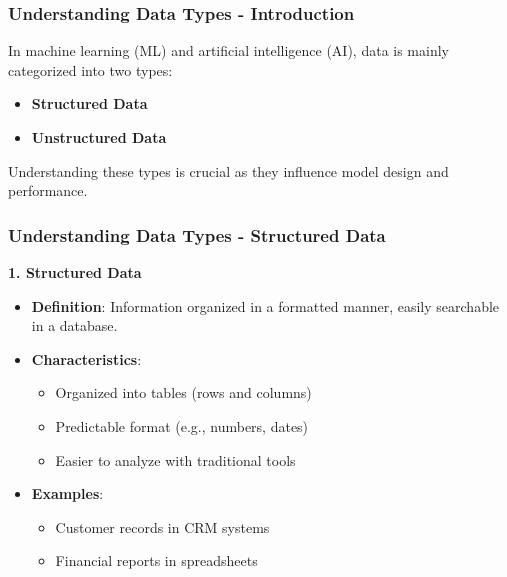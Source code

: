 \documentclass[aspectratio=169]{beamer}
\begin{document}
\begin{frame}[fragile]
    \frametitle{Understanding Data Types - Introduction}
    In machine learning (ML) and artificial intelligence (AI), data is mainly categorized into two types:
    \begin{itemize}
        \item \textbf{Structured Data}
        \item \textbf{Unstructured Data}
    \end{itemize}
    Understanding these types is crucial as they influence model design and performance.
\end{frame}

\begin{frame}[fragile]
    \frametitle{Understanding Data Types - Structured Data}
    \textbf{1. Structured Data}
    \begin{itemize}
        \item \textbf{Definition}: Information organized in a formatted manner, easily searchable in a database.
        \item \textbf{Characteristics}:
        \begin{itemize}
            \item Organized into tables (rows and columns)
            \item Predictable format (e.g., numbers, dates)
            \item Easier to analyze with traditional tools
        \end{itemize}
        \item \textbf{Examples}:
        \begin{itemize}
            \item Customer records in CRM systems
            \item Financial reports in spreadsheets
        \end{itemize}
    \end{itemize}
\end{frame}
\end{document}
